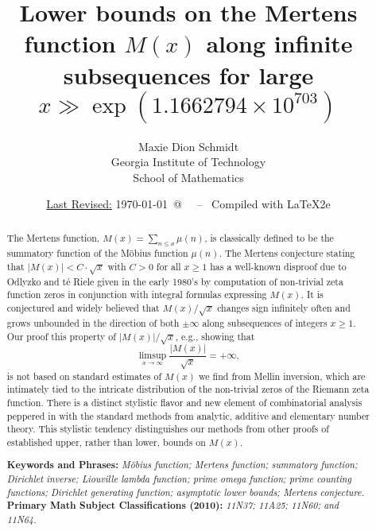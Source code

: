 \documentclass[11pt,reqno,a4letter]{article}
\title{
       \LARGE{
       Lower bounds on the Mertens function $M(x)$ along infinite subsequences for large 
       $x \gg \exp\left(1.1662794 \times 10^{703}\right)$ 
       } 
}
\author{{\Large Maxie Dion Schmidt} \\ 
        {\normalsize Georgia Institute of Technology} \\[0.025cm] 
        {\normalsize School of Mathematics} 
}
\date{\small\underline{Last Revised:} \today \ @\ \hhmmsstime{} \ -- \ Compiled with \LaTeX2e}
\numberwithin{figure}{section}
\numberwithin{table}{section}
\theoremstyle{plain}
\numberwithin{theorem}{section}
\theoremstyle{definition}
\begin{document}
 

\maketitle

\begin{abstract} 
The Mertens function, $M(x) = \sum_{n \leq x} \mu(n)$, is classically 
defined to be the summatory function of the M\"obius function 
$\mu(n)$. The 
Mertens conjecture stating that $|M(x)| < C \cdot \sqrt{x}$ with $C > 0$ for all 
$x \geq 1$ has a well-known disproof due to Odlyzko and t\'{e} Riele given in the early 1980's by computation of 
non-trivial zeta function zeros in conjunction with integral formulas expressing $M(x)$. 
It is conjectured and widely believed that $M(x) / \sqrt{x}$ changes sign infinitely often and grows 
unbounded in the direction of both $\pm \infty$ along subsequences of integers $x \geq 1$. 
Our proof this property of $|M(x)|/\sqrt{x}$, e.g., showing that 
$$\limsup_{x \rightarrow \infty} \frac{|M(x)|}{\sqrt{x}} = +\infty,$$ is not based on 
standard estimates of $M(x)$ we find from Mellin inversion, which are intimately tied to the 
intricate distribution of the non-trivial zeros of the Riemann zeta function. 
There is a distinct stylistic 
flavor and new element of combinatorial analysis 
peppered in with the standard methods from analytic, additive and elementary number theory. 
This stylistic tendency distinguishes 
our methods from other proofs of established upper, rather than lower, bounds on $M(x)$. 

\bigskip 
\noindent
\textbf{Keywords and Phrases:} {\it M\"obius function; Mertens function; summatory function; 
                                    Dirichlet inverse; Liouville lambda function; prime omega function; 
                                    prime counting functions; Dirichlet generating function; 
                                    asymptotic lower bounds; Mertens conjecture. } \\ 
\textbf{Primary Math Subject Classifications (2010):} {\it 11N37; 11A25; 11N60; and 11N64. } 
\end{abstract} 
\end{document}
